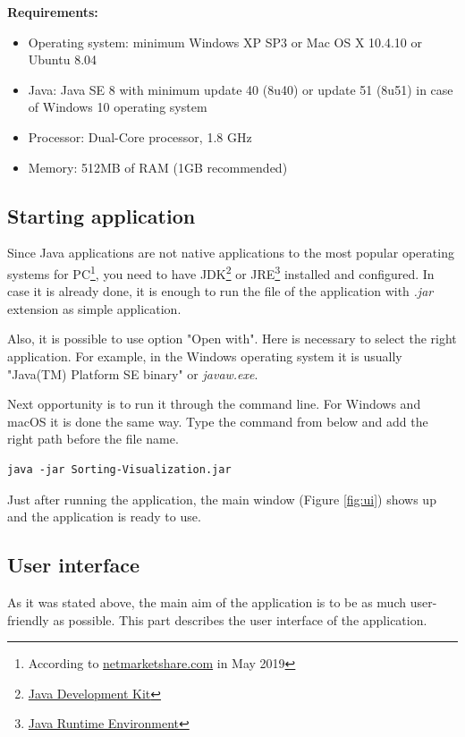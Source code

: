 \documentclass[
  field=inf,
  biblatex,
  language=english,
  glossaries,
  theorems=false,
  sourcecodes=false,
  index
]{kidiplom}
\begin{document}
\noindent \textbf{Requirements:}
\begin{itemize}
	\item Operating system: minimum Windows XP SP3 or Mac OS X 10.4.10 or Ubuntu 8.04 
	\item Java: Java SE 8 with minimum update 40 (8u40) or update 51 (8u51) in case of Windows 10 operating system
	\item Processor: Dual-Core processor, 1.8 GHz
	\item Memory: 512MB of RAM (1GB recommended)
\end{itemize}

\subsection{Starting application}

Since Java applications are not native applications to the most popular operating systems for PC\footnote{According to \href{https://netmarketshare.com/operating-system-market-share.aspx}{netmarketshare.com} in May 2019}, you need to have JDK\footnote{\href{https://www.oracle.com/technetwork/java/javase/jdk-8-readme-2095712.html}{Java Development Kit}} or JRE\footnote{\href{https://www.w3schools.in/java-tutorial/jre/}{Java Runtime Environment}} installed and configured. In case it is already done, it is enough to run the file of the application with \textit{.jar} extension as simple application.

Also, it is possible to use option "Open with". Here is necessary to select the right application. For example, in the Windows operating system it is usually "Java(TM) Platform SE binary" or \textit{javaw.exe}.

Next opportunity is to run it through the command line. For Windows and macOS it is done the same way. Type the command from below and add the right path before the file name. 
\begin{lstlisting}
java -jar Sorting-Visualization.jar
\end{lstlisting}

Just after running the application, the main window (Figure \ref{fig:ui}) shows up and the application is ready to use.

\subsection{User interface}

As it was stated above, the main aim of the application is to be as much user-friendly as possible. This part describes the user interface of the application.
\end{document}
